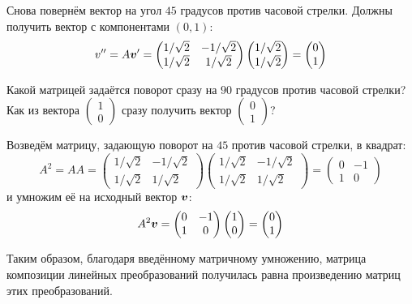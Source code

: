 \documentclass[a4paper,12pt]{article}
\theoremstyle{remark}
\begin{document}
\begin{remark}
    Снова повернём вектор на угол $45$ градусов против часовой стрелки.
    Должны получить вектор с компонентами $(0, 1)$:
    \[
      v''
      = A \boldsymbol v'
      = \begin{pmatrix}
          1/\sqrt{2} & -1/\sqrt{2}\\
          1/\sqrt{2} & 1/\sqrt{2}
        \end{pmatrix}
        \begin{pmatrix}
          1/\sqrt{2} \\ 1/\sqrt{2}
        \end{pmatrix}
      = \begin{pmatrix}
          0 \\ 1
        \end{pmatrix}
    \]
    
    Какой матрицей задаётся поворот сразу на $90$ градусов против часовой стрелки?
    Как из вектора
    $\left(\begin{smallmatrix}1 \\ 0\end{smallmatrix}\right)$
    сразу получить вектор
    $\left(\begin{smallmatrix}0 \\ 1\end{smallmatrix}\right)$?
    
    Возведём матрицу, задающую поворот на $45$ против часовой стрелки, в квадрат:
    \begin{equation}\label{eq:idea-behind-matrix-multiplication}
      A^2
      = A A
      = \begin{pmatrix}
          1/\sqrt{2} & -1/\sqrt{2}\\
          1/\sqrt{2} & 1/\sqrt{2}
        \end{pmatrix}
        \begin{pmatrix}
          1/\sqrt{2} & -1/\sqrt{2}\\
          1/\sqrt{2} & 1/\sqrt{2}
        \end{pmatrix}
      = \begin{pmatrix}
          0 & -1\\
          1 & 0
        \end{pmatrix}
    \end{equation}
    и умножим её на исходный вектор $\boldsymbol v$:
    \[
      A^2 \boldsymbol v
      = \begin{pmatrix}
          0 & -1\\
          1 & 0
        \end{pmatrix}
        \begin{pmatrix}
          1 \\ 0
        \end{pmatrix}
      = \begin{pmatrix}
          0 \\ 1
        \end{pmatrix}
    \]
    
    Таким образом, благодаря введённому матричному умножению, матрица композиции линейных преобразований получилась равна произведению матриц этих преобразований.
  \end{remark}
  
\end{document}
